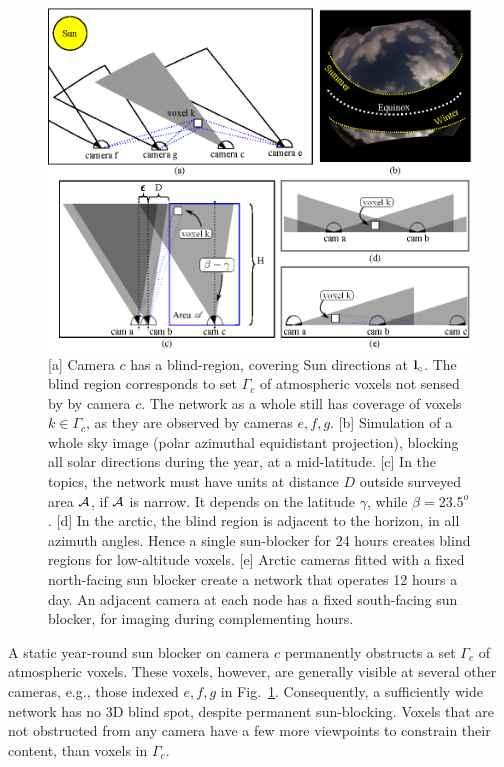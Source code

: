 \documentclass[runningheads]{llncs}
\begin{document}
\begin{figure}[t!]
\begin{center}
   \includegraphics[width=0.8\linewidth]{figures/sun_blocks2.eps}
\end{center}
   \vspace{-0.6cm}
   \caption{[a] Camera $c$ has a blind-region, covering Sun directions at ${\bf l}_c$. The blind region corresponds to set $\Gamma_c$ of atmospheric voxels not sensed by by camera $c$. The network as a whole still has coverage of voxels $k\in\Gamma_c$, as they are observed by cameras $e,f,g$.
   [b] Simulation of a whole sky image (polar azimuthal equidistant projection), blocking
   all solar directions during the year, at a mid-latitude.
   [c] In the topics, the network must have units at distance $D$ outside surveyed area ${\cal A}$, if ${\cal A}$ is narrow.  It depends on the latitude $\gamma$, while
   $\beta=23.5^o$.
   [d] In the arctic, the blind region is adjacent to the horizon, in all azimuth angles. Hence a single sun-blocker for 24 hours creates blind regions for low-altitude voxels. [e] Arctic cameras fitted with a fixed north-facing sun blocker create a network
   that operates 12 hours a day. An adjacent camera at each node has a fixed south-facing sun blocker, for imaging during complementing hours.
   }
\label{fig:blindspot}
\end{figure}


A static year-round sun blocker on camera $c$ permanently obstructs a set $\Gamma_c$ of atmospheric voxels. These voxels, however, are generally visible at several other cameras, e.g., those indexed $e,f,g$ in Fig.~\ref{fig:blindspot}. Consequently, a sufficiently wide network has no 3D blind spot, despite permanent sun-blocking. Voxels that are not obstructed from any camera have a few more viewpoints to constrain their content, than voxels in $\Gamma_c$.
\end{document}
